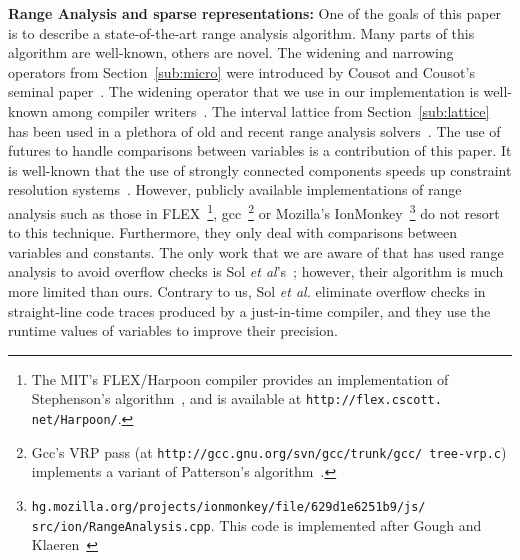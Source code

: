 \documentclass[preprint]{sigplanconf}[10pt]
\begin{document}
\noindent
\textbf{Range Analysis and sparse representations:}
One of the goals of this paper is to describe a state-of-the-art range analysis
algorithm.
Many parts of this algorithm are well-known, others are novel.
The widening and narrowing operators from Section~\ref{sub:micro} were
introduced by Cousot and Cousot's seminal paper~\cite{Cousot77}.
The widening operator that we use in our implementation is well-known among
compiler writers~\cite[p.228]{Nielson99}.
The interval lattice from Section~\ref{sub:lattice} has been used in a
plethora of old and recent range analysis
solvers~\cite{Gough94,Mahlke01,Oh12,Patterson95,Stephenson00,Su05}.
The use of futures to handle comparisons between variables is a contribution
of this paper.
It is well-known that the use of strongly connected components speeds up
constraint resolution systems~\cite[Sec 6.3]{Nielson99}.
However, publicly available implementations of range analysis such as those in
FLEX~\footnote{The MIT's FLEX/Harpoon compiler
provides an implementation of Stephenson's algorithm~\cite{Stephenson00}, and
is available at \texttt{http://flex.cscott. net/Harpoon/}.},
gcc~\footnote{Gcc's VRP pass (at \texttt{http://gcc.gnu.org/svn/gcc/trunk/gcc/
tree-vrp.c}) implements a variant of Patterson's
algorithm~\cite{Patterson95}.} or Mozilla's IonMonkey~\footnote{\texttt{hg.mozilla.org/projects/ionmonkey/file/629d1e6251b9/js/
src/ion/RangeAnalysis.cpp}. This code is implemented after Gough and
Klaeren~\cite{Gough94}} do not resort to this technique.
Furthermore, they only deal with comparisons between variables and constants.
The only work that we are aware of that has used range analysis to avoid
overflow checks is Sol {\em et al}'s~\cite{Sol11}; however, their algorithm
is much more limited than ours.
Contrary to us, Sol {\em et al.} eliminate overflow checks in
straight-line code traces produced by a just-in-time compiler, and they use the
runtime values of variables to improve their precision.
\end{document}
